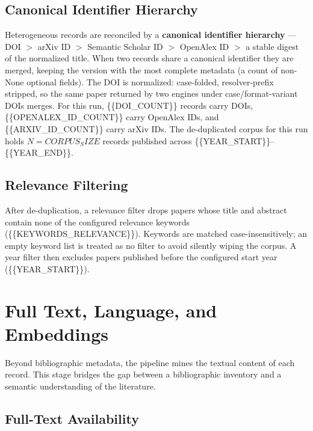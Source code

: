 \documentclass[
]{article}
\begin{document}
\subsection{Canonical Identifier
Hierarchy}\label{canonical-identifier-hierarchy}

Heterogeneous records are reconciled by a \textbf{canonical identifier
hierarchy} --- DOI \(>\) arXiv ID \(>\) Semantic Scholar ID \(>\)
OpenAlex ID \(>\) a stable digest of the normalized title. When two
records share a canonical identifier they are merged, keeping the
version with the most complete metadata (a count of non-None optional
fields). The DOI is normalized: case-folded, resolver-prefix stripped,
so the same paper returned by two engines under case/format-variant DOIs
merges. For this run, \{\{DOI\_COUNT\}\} records carry DOIs,
\{\{OPENALEX\_ID\_COUNT\}\} carry OpenAlex IDs, and
\{\{ARXIV\_ID\_COUNT\}\} carry arXiv IDs. The de-duplicated corpus for
this run holds \(N = {{CORPUS_SIZE}}\) records published across
\{\{YEAR\_START\}\}--\{\{YEAR\_END\}\}.

\subsection{Relevance Filtering}\label{relevance-filtering}

After de-duplication, a relevance filter drops papers whose title and
abstract contain none of the configured relevance keywords
(\{\{KEYWORDS\_RELEVANCE\}\}). Keywords are matched case-insensitively;
an empty keyword list is treated as no filter to avoid silently wiping
the corpus. A year filter then excludes papers published before the
configured start year (\{\{YEAR\_START\}\}).

\newpage

\section{Full Text, Language, and
Embeddings}\label{full-text-language-and-embeddings}

Beyond bibliographic metadata, the pipeline mines the textual content of
each record. This stage bridges the gap between a bibliographic
inventory and a semantic understanding of the literature.

\subsection{Full-Text Availability}\label{full-text-availability}
\end{document}
